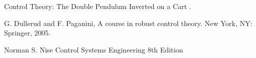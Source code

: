 %

%

\begin{flushleft}
\begin{thebibliography}{9}


Control Theory: The Double Pendulum Inverted on a Cart
.


G. Dullerud and F. Paganini, A course in robust control theory. New York, NY: Springer, 2005.

Norman S. Nise Control Systems Engineering 8th Edition
\end{thebibliography}
\end{flushleft}

%
